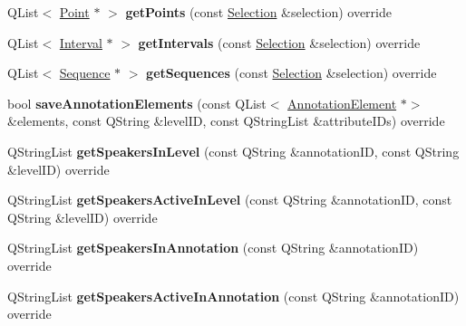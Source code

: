 \begin{DoxyCompactItemize}
Q\+List$<$ \hyperlink{class_point}{Point} $\ast$ $>$ {\bfseries get\+Points} (const \hyperlink{class_annotation_datastore_1_1_selection}{Selection} \&selection) override
\item 
\mbox{\label{class_x_m_l_annotation_datastore_a051863d3bc30a1103bbedd185e42a977}} 
Q\+List$<$ \hyperlink{class_interval}{Interval} $\ast$ $>$ {\bfseries get\+Intervals} (const \hyperlink{class_annotation_datastore_1_1_selection}{Selection} \&selection) override
\item 
\mbox{\label{class_x_m_l_annotation_datastore_a0d69736278a890a5372021c91b4dfd60}} 
Q\+List$<$ \hyperlink{class_sequence}{Sequence} $\ast$ $>$ {\bfseries get\+Sequences} (const \hyperlink{class_annotation_datastore_1_1_selection}{Selection} \&selection) override
\item 
\mbox{\label{class_x_m_l_annotation_datastore_ae5c6f6ba83411754b0264dbb9d775b5d}} 
bool {\bfseries save\+Annotation\+Elements} (const Q\+List$<$ \hyperlink{class_annotation_element}{Annotation\+Element} $\ast$$>$ \&elements, const Q\+String \&level\+ID, const Q\+String\+List \&attribute\+I\+Ds) override
\item 
\mbox{\label{class_x_m_l_annotation_datastore_a224c092563c68225d0734f3b43e82a96}} 
Q\+String\+List {\bfseries get\+Speakers\+In\+Level} (const Q\+String \&annotation\+ID, const Q\+String \&level\+ID) override
\item 
\mbox{\label{class_x_m_l_annotation_datastore_a8cde286c187e6c84434e727ffd6b413f}} 
Q\+String\+List {\bfseries get\+Speakers\+Active\+In\+Level} (const Q\+String \&annotation\+ID, const Q\+String \&level\+ID) override
\item 
\mbox{\label{class_x_m_l_annotation_datastore_a673882db6895f878fc08346fa4aa2146}} 
Q\+String\+List {\bfseries get\+Speakers\+In\+Annotation} (const Q\+String \&annotation\+ID) override
\item 
\mbox{\label{class_x_m_l_annotation_datastore_a9ac590569317317a705dbc1448504d27}} 
Q\+String\+List {\bfseries get\+Speakers\+Active\+In\+Annotation} (const Q\+String \&annotation\+ID) override
$$
\end{DoxyCompactItemize}
